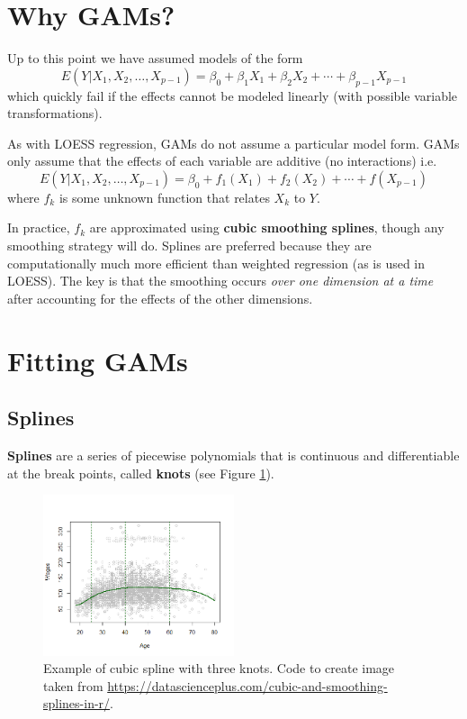 \documentclass[12pt]{../notes}
\begin{document}

\section{Why GAMs?}

Up to this point we have assumed models of the form 
%
\begin{equation*}
E\left(Y|X_1, X_2, \ldots , X_{p-1}\right) = \beta_0 + \beta_1X_1 + \beta_2X_2 +\cdots + \beta_{p-1}X_{p-1} 
\end{equation*}
%
which quickly fail if the effects cannot be modeled linearly (with possible variable transformations). 

\nspace
As with LOESS regression, GAMs do not assume a particular model form. GAMs only assume that the effects of each variable are additive (no interactions) i.e. 
%
\begin{equation*}
E\left(Y|X_1, X_2, \ldots , X_{p-1}\right) = \beta_0 + f_1(X_1) + f_2(X_2) +\cdots + f(X_{p-1}) 
\end{equation*}
%
where $f_k$ is some unknown function that relates $X_k$ to $Y$.

\nspace
In practice, $f_k$ are approximated using \textbf{cubic smoothing splines}, though any smoothing strategy will do. Splines are preferred because they are computationally much more efficient than weighted regression (as is used in LOESS). The key is that the smoothing occurs \textit{over one dimension at a time} after accounting for the effects of the other dimensions.  

\section{Fitting GAMs}

\subsection{Splines}

\textbf{Splines} are a series of piecewise polynomials that is continuous and differentiable at the break points, called \textbf{knots} (see Figure \ref{fig:spline_example}).

\begin{figure}[H]
\centering
\includegraphics[width = 0.5\textwidth]{../figures/module7/spline_example.png}
\caption{Example of cubic spline with three knots. Code to create image taken from \url{https://datascienceplus.com/cubic-and-smoothing-splines-in-r/}.}
\label{fig:spline_example}
\end{figure}
\end{document}
